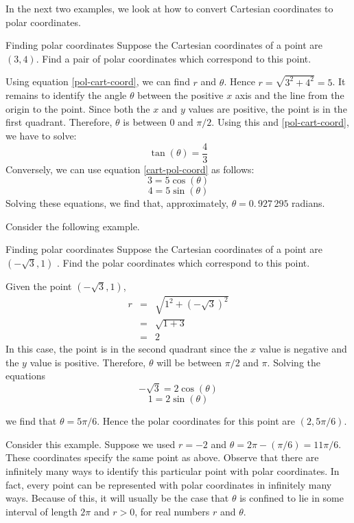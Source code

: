 In the next two examples, we look at how to convert Cartesian coordinates to polar coordinates. 

\begin{example}{Finding polar coordinates}{}
Suppose the Cartesian coordinates of a point are $(3,4)$. Find
a pair of polar coordinates which correspond to this point.
\end{example}

\begin{solution}
Using equation {\eqref{pol-cart-coord}}, we can find $r$ and $\theta$. Hence $r=\sqrt{3^{2}+4^{2}}=5$. It remains to identify the angle $\theta$ between the positive $x$ axis and the line from the origin to the point. Since both the $x$ and $y$ values are positive, the point is in the
first quadrant. Therefore, $\theta$ is between $0$ and $\pi/2$. 
Using this and {\eqref{pol-cart-coord}}, we have to solve:
\[
\tan(\theta)=\frac{4}{3}
\]
Conversely, we can use equation {\eqref{cart-pol-coord}} as follows:
\[
3=5\cos (\theta) 
\]
\[
4 = 5\sin (\theta) 
\]
Solving these equations, we find that, 
approximately, $\theta =0.\, 927\,295$ radians.
\end{solution}

Consider the following example.

\begin{example}{Finding polar coordinates}{}
Suppose the Cartesian coordinates of a point are $(-\sqrt{3},1)$
. Find the polar coordinates which correspond to this point.
\end{example}

\begin{solution}
Given the point $(-\sqrt{3}, 1)$, 
\begin{eqnarray*}
r &=& \sqrt{ 1^2 + (-\sqrt{3})^2}\\
&=& \sqrt{1 + 3}\\
&=&2
\end{eqnarray*}
 In this case, the point is in the second quadrant since the $x$ value is negative and the $y$ value is positive. Therefore, $\theta$ will be between $\pi/2$ and $\pi$.
Solving the equations
\[
-\sqrt{3}= 2 \cos (\theta)
\]
\[
1 = 2 \sin (\theta) 
\]

we find that $\theta = 5\pi /6$.
Hence the polar coordinates for this point are $(2, 5\pi /6)$.
\end{solution}

Consider this example. Suppose we used $r=-2$ and $\theta =2\pi -(\pi /6) = 11\pi /6$. These coordinates specify the same point as above. Observe that there are infinitely many ways to identify this
particular point with polar coordinates. In fact, every point can be represented with polar coordinates in infinitely many ways. Because of this, it will usually be
the case that $\theta $ is confined to lie in some interval
of length $2\pi $ and $r>0$, for real numbers $r$ and $\theta$. 

